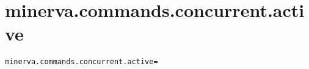 \section{minerva.commands.concurrent.active}
\label{configuration:MinervaCommandsConcurrentActive}
\AvailableInCsharpOnly{\TODO}
\begin{lstlisting}[style=Props,caption={Usage example for \textit{minerva.commands.concurrent.active}}]
minerva.commands.concurrent.active=
\end{lstlisting}